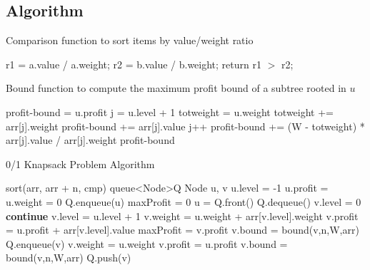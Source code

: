 \documentclass[12pt]{article}%
\begin{document}
  \subsection{Algorithm \cite{gfg_ks}}
    \begin{algorithm}[H]
        \caption{Comparison function to sort items by value/weight ratio}\label{cmp}
        \begin{algorithmic}[1]
          \State r1 = a.value / a.weight; 
          \State r2 = b.value / b.weight; 
          \State return r1 $>$ r2; 
        \EndFunction
      \end{algorithmic}
    \end{algorithm}
    \begin{algorithm}[H]
        \caption{Bound function to compute the maximum profit bound of a subtree rooted in $u$}\label{bnd}
        \begin{algorithmic}[1]
              \State {}
            \EndIf
            \State profit-bound = u.profit
            \State j = u.level + 1
            \State totweight = u.weight
              \State totweight    += arr[j].weight
              \State profit-bound += arr[j].value
              \State j++
            \EndWhile 
                \State profit-bound += (W - totweight) * arr[j].value / arr[j].weight
            \EndIf
            \State \Return profit-bound
          \EndFunction
        \end{algorithmic}
    \end{algorithm}
    \begin{algorithm}[H]
        \caption{0/1 Knapsack Problem Algorithm}\label{ks}
        \begin{algorithmic}[1]
          \State sort(arr, arr + n, cmp)
          \State queue\textless Node\textgreater Q 
          \State Node u, v 
          \State u.level = -1
          \State u.profit = u.weight = 0
          \State Q.enqueue(u)
          \State maxProfit = 0
            \State u = Q.front()
            \State Q.dequeue()
              \State v.level = 0
            \EndIf
              \State \textbf{continue}
            \EndIf
            \State v.level = u.level + 1 
            \State v.weight = u.weight + arr[v.level].weight 
            \State v.profit = u.profit + arr[v.level].value 
              \State maxProfit = v.profit
            \EndIf
            \State v.bound = bound(v,n,W,arr)
              \State Q.enqueue(v)
            \EndIf
            \State v.weight = u.weight
            \State v.profit = u.profit 
            \State v.bound = bound(v,n,W,arr)
              \State Q.push(v)
            \EndIf
          \EndWhile 
        \EndFunction
      \end{algorithmic}
    \end{algorithm}
\end{document}
